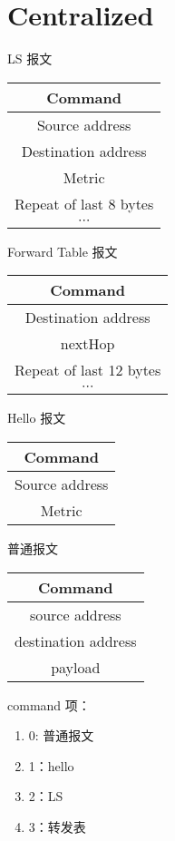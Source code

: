\documentclass[15pt]{ctexart}
\begin{document}
\section{Centralized}
	LS 报文
	\begin{table}[H]
	\centering
		\begin{tabular}{|c|}
			\hline
			Command \\
			\hline
			Source address \\
			\hline
			Destination address \\
			\hline
			Metric \\
			\hline
			Repeat of last 8 bytes \\
			\hline
			$\cdots$ \\
			\hline
		\end{tabular}		
	\end{table}
	Forward Table 报文
	\begin{table}[H]
	\centering
		\begin{tabular}{|c|}
			\hline
			Command \\
			\hline
			Destination address \\
			\hline
			nextHop \\
			\hline
			Repeat of last 12 bytes \\
			\hline
			$\cdots$ \\
			\hline
		\end{tabular}		
	\end{table}
	Hello 报文
	\begin{table}[H]
	\centering
		\begin{tabular}{|c|}
			\hline
			Command        \\
			\hline
			Source address \\
			\hline
			Metric         \\
			\hline
		\end{tabular}
	\end{table}
	普通报文
	\begin{table}[H]
	\centering
		\begin{tabular}{|c|}
			\hline
			Command \\
			\hline
			source address \\
			\hline
			destination address \\
			\hline
			payload \\
			\hline
		\end{tabular}		
	\end{table}
	command 项：
	\begin{enumerate}[]
		\item 0: 普通报文
		\item 1：hello
		\item 2：LS
		\item 3：转发表
	\end{enumerate}
\end{document}
